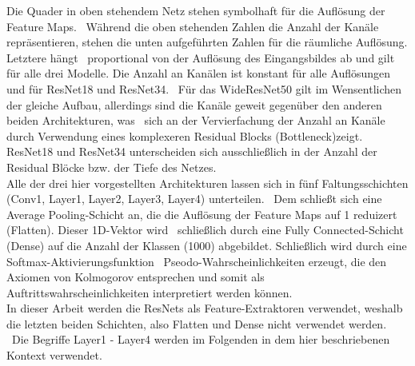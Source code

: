 Die Quader in oben stehendem Netz stehen symbolhaft für die Auflösung der Feature Maps. \
Während die oben stehenden Zahlen die Anzahl der Kanäle repräsentieren, stehen die unten aufgeführten Zahlen für die räumliche Auflösung. Letztere hängt \ 
proportional von der Auflösung des Eingangsbildes ab und gilt für alle drei Modelle. Die Anzahl an Kanälen ist konstant für alle Auflösungen und für ResNet18 und ResNet34. \
Für das WideResNet50 gilt im Wensentlichen der gleiche Aufbau, allerdings sind die Kanäle \glqq geweit\grqq{} gegenüber den anderen beiden Architekturen, was \
sich an der Vervierfachung der Anzahl an Kanäle durch Verwendung eines komplexeren Residual Blocks (\glqq Bottleneck\grqq{}\cite{wideresnet})zeigt. 
ResNet18 und ResNet34 unterscheiden sich ausschließlich in der Anzahl der Residual Blöcke bzw. der Tiefe des Netzes. \\
Alle der drei hier vorgestellten Architekturen lassen sich in fünf Faltungsschichten (\glqq Conv1\grqq{}, \glqq Layer1\grqq{}, \glqq Layer2\grqq{}, \glqq Layer3\grqq{}, \glqq Layer4\grqq{}) unterteilen. \
Dem schließt sich eine \glqq Average Pooling\grqq{}-Schicht an, die die Auflösung der Feature Maps auf 1 reduizert (\glqq Flatten\grqq{}). Dieser 1D-Vektor wird \
schließlich durch eine \glqq Fully Connected\grqq{}-Schicht (\glqq Dense\grqq{}) auf die Anzahl der Klassen (1000) abgebildet. Schließlich wird durch eine \glqq Softmax\grqq{}-Aktivierungsfunktion \
Pseodo-Wahrscheinlichkeiten erzeugt, die den Axiomen von Kolmogorov entsprechen und somit als Auftrittswahrscheinlichkeiten interpretiert werden können.\\
In dieser Arbeit werden die ResNets als Feature-Extraktoren verwendet, weshalb die letzten beiden Schichten, also \glqq Flatten\grqq{} und \glqq Dense\grqq{} nicht verwendet werden. \ 
Die Begriffe \glqq Layer1 - Layer4\grqq{} werden im Folgenden in dem hier beschriebenen Kontext verwendet. \\ 

